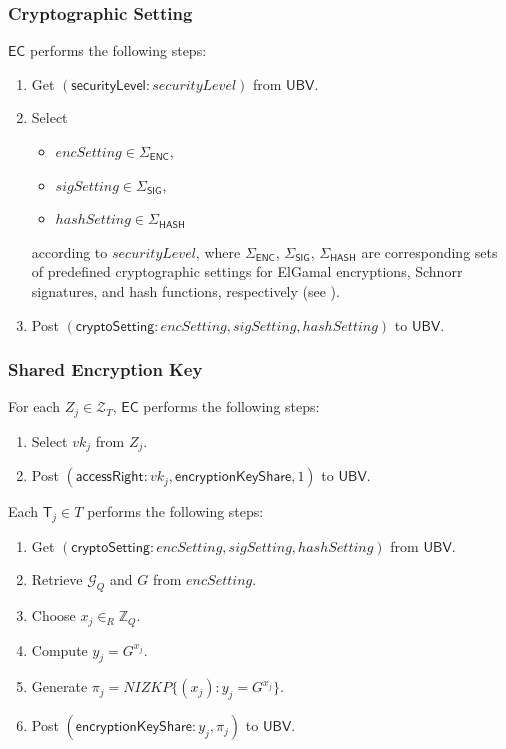 \documentclass[bibtotoc,halfparskip,oneside]{scrreprt}
\newcommand{\security}{\mathit{securityLevel}\xspace}
\newcommand{\vk}[1]{\mathit{vk}_{#1}\xspace}
\newcommand{\EC}{\ensuremath{\mathsf{EC}}\xspace}
\newcommand{\UBV}{\ensuremath{\mathsf{UBV}}\xspace}
\newcommand{\Tallier}[1]{\ensuremath{\mathsf{T}_{#1}}\xspace}
\begin{document}
	\subsubsection{Cryptographic Setting}
	
	\EC performs the following steps:
	\begin{enumerate}
		\item Get $(\mathsf{securityLevel}: \security)$ from \UBV.
		\item Select 
		\begin{itemize}
			\item $\mathit{encSetting}\in \Sigma_\mathsf{ENC}$, 
			\item $\mathit{sigSetting}\in \Sigma_\mathsf{SIG}$, 
			\item $\mathit{hashSetting}\in \Sigma_\mathsf{HASH}$ 
		\end{itemize}
		according to $\security$, where $\Sigma_\mathsf{ENC}$, $\Sigma_\mathsf{SIG}$, $\Sigma_\mathsf{HASH}$ are corresponding sets of predefined cryptographic settings for ElGamal encryptions, Schnorr signatures, and hash functions, respectively (see ).
		\item Post $(\mathsf{cryptoSetting}:\mathit{encSetting},\mathit{sigSetting},\mathit{hashSetting})$ to \UBV.	
	\end{enumerate}
	
	\subsubsection{Shared Encryption Key}
	
	For each $Z_{j}\in \mathcal{Z}_{T}$, \EC performs the following steps:
	\begin{enumerate}	
		\item Select $\vk{j}$ from $Z_{j}$.
		\item Post $(\mathsf{accessRight}:\vk{j},\mathsf{encryptionKeyShare},1)$ to \UBV.
	\end{enumerate}
	
	Each $\Tallier{j}\in T$ performs the following steps:
	\begin{enumerate}[resume]
		\item Get $(\mathsf{cryptoSetting}:\mathit{encSetting},\mathit{sigSetting},\mathit{hashSetting})$ from \UBV.
		\item Retrieve $\mathcal{G}_Q$ and $G$ from $\mathit{encSetting}$.
		\item Choose $x_j\in_R\mathbb{Z}_Q$.
		\item Compute $y_j = G^{x_j}$.
		\item Generate $\pi_{j}=\mathit{NIZKP}\{(x_j):y_j=G^{x_j}\}$.
		\item Post $(\mathsf{encryptionKeyShare}:y_j,\pi_{j})$ to \UBV.
	\end{enumerate}
	
\end{document}
